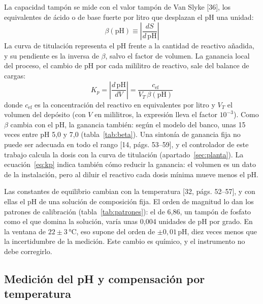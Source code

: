 La capacidad tampón se mide con el valor tampón de Van Slyke [36], los equivalentes de ácido o de base fuerte por litro que desplazan el pH una unidad:
\begin{equation}
\beta(\mathrm{pH})\equiv\left|\frac{dS}{d\,\mathrm{pH}}\right|\label{eq:beta}
\end{equation}
La curva de titulación representa el pH frente a la cantidad de reactivo añadida, y su pendiente es la inversa de $\beta$, salvo el factor de volumen. La ganancia local del proceso, el cambio de pH por cada mililitro de reactivo, sale del balance de cargas:
\begin{equation}
K_p=\left|\frac{d\,\mathrm{pH}}{dV}\right|=\frac{c_{\text{ef}}}{V_T\,\beta(\mathrm{pH})}\label{eq:kp}
\end{equation}
donde $c_{\text{ef}}$ es la concentración del reactivo en equivalentes por litro y $V_T$ el volumen del depósito (con $V$ en mililitros, la expresión lleva el factor $10^{-3}$). Como $\beta$ cambia con el pH, la ganancia también: según el modelo del banco, unas 15 veces entre pH 5,0 y 7,0 (tabla~\ref{tab:beta}). Una sintonía de ganancia fija no puede ser adecuada en todo el rango [14, págs. 53–59], y el controlador de este trabajo calcula la dosis con la curva de titulación (apartado~\ref{sec:planta}). La ecuación~\eqref{eq:kp} indica también cómo reducir la ganancia: el volumen es un dato de la instalación, pero al diluir el reactivo cada dosis mínima mueve menos el pH.

Las constantes de equilibrio cambian con la temperatura [32, págs. 52–57], y con ellas el pH de una solución de composición fija. El orden de magnitud lo dan los patrones de calibración (tabla~\ref{tab:patrones}): el de 6,86, un tampón de fosfato como el que domina la solución, varía unas 0,004 unidades de pH por grado. En la ventana de $22\pm3$\,°C, eso supone del orden de $\pm0{,}01$\,pH, diez veces menos que la incertidumbre de la medición. Este cambio es químico, y el instrumento no debe corregirlo.

\subsection{Medición del pH y compensación por temperatura}\label{sec:medicion}


